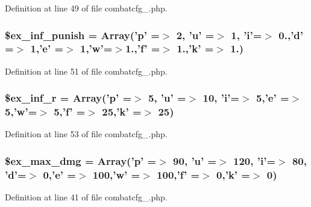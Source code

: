 Definition at line 49 of file combatcfg\+\_.\+php.

\hypertarget{combatcfg__1_8php_ac8f55d376b621b701cb57380cea7f37b}{
\subsubsection[{\$ex\+\_\+inf\+\_\+punish}]{\setlength{\rightskip}{0pt plus 5cm}\$ex\+\_\+inf\+\_\+punish = Array('p' =$>$ 2, 'u' =$>$ 1, 'i'=$>$ 0.,'d' =$>$ 1,'e' =$>$ 1,'w'=$>$1.,'f' =$>$ 1.,'k' =$>$ 1.)}}\label{combatcfg__1_8php_ac8f55d376b621b701cb57380cea7f37b}


Definition at line 51 of file combatcfg\+\_.\+php.

\hypertarget{combatcfg__1_8php_a35df3cfaaef964eda483dcd735ed3f01}{
\subsubsection[{\$ex\+\_\+inf\+\_\+r}]{\setlength{\rightskip}{0pt plus 5cm}\$ex\+\_\+inf\+\_\+r = Array('p' =$>$ 5, 'u' =$>$ 10, 'i'=$>$ 5,'e' =$>$ 5,'w'=$>$ 5,'f' =$>$ 25,'k' =$>$ 25)}}\label{combatcfg__1_8php_a35df3cfaaef964eda483dcd735ed3f01}


Definition at line 53 of file combatcfg\+\_.\+php.

\hypertarget{combatcfg__1_8php_abe8d9cfb9542e9143a593af2f79e6ea4}{
\subsubsection[{\$ex\+\_\+max\+\_\+dmg}]{\setlength{\rightskip}{0pt plus 5cm}\$ex\+\_\+max\+\_\+dmg = Array('p' =$>$ 90, 'u' =$>$ 120, 'i'=$>$ 80, 'd'=$>$ 0,'e' =$>$ 100,'w' =$>$ 100,'f' =$>$ 0,'k' =$>$ 0)}}\label{combatcfg__1_8php_abe8d9cfb9542e9143a593af2f79e6ea4}


Definition at line 41 of file combatcfg\+\_.\+php.

